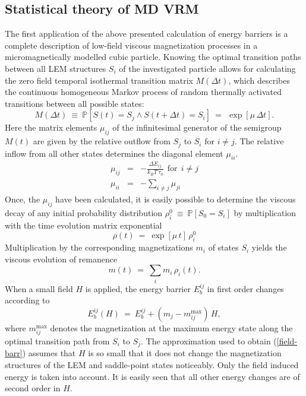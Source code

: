 \subsection{Statistical theory of MD VRM}
The first application of the above presented calculation of energy barriers is a complete
description of low-field viscous magnetization processes in a micromagnetically modelled
cubic particle.
%
%
Knowing the optimal transition paths between all  LEM structures $S_i$
of the investigated particle
allows for calculating the zero field temporal isothermal transition matrix $M(\Delta t)$,
which describes the continuous homogeneous Markov process of random thermally activated transitions
between all possible states:
\begin{equation}\label{transmat}
   M (\Delta t)~\equiv~\mathbb{P}\left[{ S(t)= S_j  \wedge S(t+\Delta t)= S_i }\right]~=~
   \,\exp\left[\mu \, \Delta t \right].
\end{equation}
Here the matrix elements $\mu_{ij}$ of the infinitesimal generator of the semigroup  $M(t)$ are given by
the relative outflow from $S_j$ to $S_i$ for $i\neq j$. The relative inflow from all other
states determines the diagonal element $\mu_{ii}$.
\begin{eqnarray}
  \mu_{ij} &=& -\frac{\Delta E_{ij}}{k_B T\,\tau_0} ~~\mbox{for}~~i\neq j\\
  \mu_{ii}&=& -\sum \limits_{i\neq j}  \mu_{ji}
\end{eqnarray}
Once, the $ \mu_{ij}$ have been calculated, it is easily possible to determine the viscous decay
of any initial probability distribution
$\rho_i^0~\equiv~\mathbb{P}\left[{ S_0=  S_i }\right]$
by   multiplication with the time evolution matrix exponential
\begin{equation}\label{probdens}
   \rho( t) ~=~\exp\left[\mu \,  t \right]\, \rho_i^0
\end{equation}
Multiplication by the corresponding magnetizations $m_i$ of states $S_i$ yields the
viscous evolution of remanence
\begin{equation}\label{VRMt}
    m(t) ~=~ \sum \limits_i m_i\, \rho_i(t).
\end{equation}
%
When a small field $H$ is applied, the energy barrier
$E_b^{ij}$ in first order  changes according to
\begin{equation}\label{field-barr}
    E_b^{ij}(H)~=~  E_b^{ij}+ (m_j - m_{ij}^{\max})\, H,
\end{equation}
where $m_{ij}^{\max}$ denotes the magnetization  at the  maximum
energy state along the optimal transition path from $S_i$ to $S_j$.
The approximation used to obtain (\ref{field-barr}) assumes that $H$ is so small
that it does not change the magnetization structures of the LEM and saddle-point states noticeably.
Only the field induced energy is taken into account.
It is easily seen that all other energy changes are of second order in $H$.

